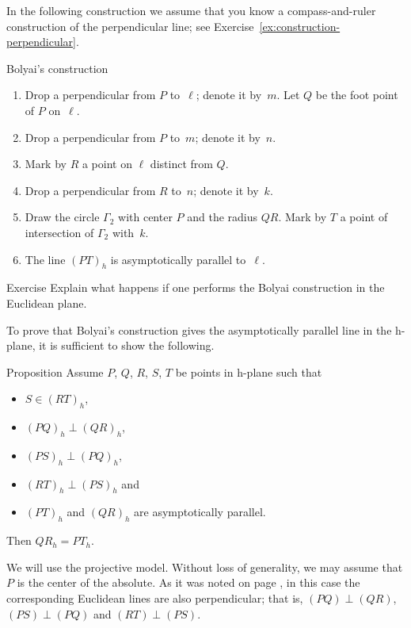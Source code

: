 In the following construction we assume that you know a compass-and-ruler construction of the perpendicular line; see Exercise~\ref{ex:construction-perpendicular}.

\begin{thm}{Bolyai's construction}
\begin{enumerate}
\item Drop a perpendicular from $P$ to~$\ell$; denote it by~$m$.
Let $Q$ be the foot point of $P$ on~$\ell$.
\item Drop a perpendicular from $P$ to~$m$; denote it by~$n$.
\item Mark by $R$ a point on $\ell$ distinct from $Q$.
\item Drop a perpendicular from $R$ to~$n$; denote it by~$k$. 
\item Draw the circle $\Gamma_2$ with center $P$ and the radius $QR$. 
Mark by $T$ a point of intersection of $\Gamma_2$ with~$k$.
\item The line $(PT)_h$ is asymptotically parallel to~$\ell$.
\end{enumerate}
\end{thm}

\begin{thm}{Exercise}\label{ex:Boyai-in-Euclid}
Explain what happens if one performs the Bolyai construction in the Euclidean plane.
\end{thm}

To prove that Bolyai's construction gives the asymptotically parallel line in the h-plane,
it is sufficient to show the following.

\begin{thm}{Proposition}\label{prop:boyai}
Assume $P$, $Q$, $R$, $S$, $T$ be points in h-plane
such that 
\begin{itemize}
\item $S\in (RT)_h$,
\item $(PQ)_h\perp (QR)_h$,
\item $(PS)_h\perp(PQ)_h$,
\item $(RT)_h\perp (PS)_h$ and 
\item $(PT)_h$ and $(QR)_h$ are asymptotically parallel.
\end{itemize}
Then $QR_h=PT_h$.
\end{thm}


We will use the projective model.
Without loss of generality, we may assume that $P$ is the center of the absolute.
As it was noted on page \pageref{klein-angles},
in this case the corresponding Euclidean lines are also perpendicular;
that is, $(PQ)\perp (QR)$, $(PS)\perp(PQ)$ and $(RT)\perp (PS)$.

